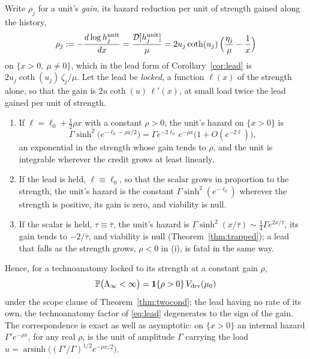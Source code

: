 \begin{corollary}\label{cor:locked}
Write $\rho_j$ for a unit's \emph{gain}, its hazard reduction per unit of
strength gained along the history,
\begin{equation}\label{eq:gain}
\rho_j:=-\frac{d\log h^{\mathrm{unit}}_j}{dx}
=\frac{\mathcal D[h^{\mathrm{unit}}_j]}{\mu}
=2u_j\coth(u_j)\,\Bigl(\frac{\eta_j}{\mu}-\frac1x\Bigr)
\end{equation}
on $\{x>0,\ \mu\neq0\}$, which in the lead form of
Corollary~\ref{cor:lead} is $2u_j\coth(u_j)\,\zeta_j/\mu$. Let the lead be
\emph{locked}, a function $\ell(x)$ of the strength alone, so that the
gain is $2u\coth(u)\,\ell'(x)$, at small load twice the lead gained per
unit of strength.
\begin{enumerate}[label=\emph{(\roman*)},itemsep=1pt]
\item If $\ell=\ell_0+\tfrac12\rho x$ with a constant $\rho>0$, the unit's
hazard on $\{x>0\}$ is
\[
\Gamma\sinh^2\!\bigl(e^{-\ell_0-\rho x/2}\bigr)
=\Gamma e^{-2\ell_0}\,e^{-\rho x}\bigl(1+O(e^{-2\ell})\bigr),
\]
an exponential in the strength whose gain tends to $\rho$, and the unit
is integrable wherever the credit grows at least linearly.
\item If the lead is held, $\ell\equiv\ell_0$, so that the scalar grows in
proportion to the strength, the unit's hazard is the constant
$\Gamma\sinh^2(e^{-\ell_0})$ wherever the strength is positive, its gain
is zero, and viability is null.
\item If the scalar is held, $\tau\equiv\bar\tau$, the unit's hazard is
$\Gamma\sinh^2(x/\bar\tau)\sim\tfrac14\Gamma e^{2x/\bar\tau}$, its gain
tends to $-2/\bar\tau$, and viability is null
(Theorem~\ref{thm:trapped}); a lead that falls as the strength grows,
$\rho<0$ in (i), is fatal in the same way.
\end{enumerate}
Hence, for a technoanatomy locked to its strength at a constant gain
$\rho$,
\begin{equation}\label{eq:locked}
\mathbb{P}\bigl(\Lambda_\infty<\infty\bigr)=\mathbf{1}\{\rho>0\}\,V_{\mathrm{drv}}(\mu_0)
\end{equation}
under the scope clause of Theorem~\ref{thm:twocond}: the lead having no
rate of its own, the technoanatomy factor of \eqref{eq:lead} degenerates
to the sign of the gain. The correspondence is exact as well as
asymptotic: on $\{x>0\}$ an internal hazard $\Gamma'e^{-\rho x}$, for any
real $\rho$, is the unit of amplitude $\Gamma$ carrying the load
$u=\operatorname{arsinh}\bigl((\Gamma'/\Gamma)^{1/2}e^{-\rho x/2}\bigr)$.
\end{corollary}

